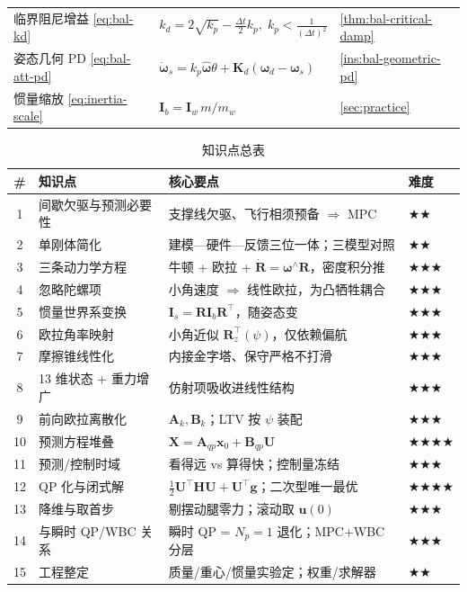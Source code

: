\begin{table}[H]
\begin{tabular}{lll}
临界阻尼增益 \cref{eq:bal-kd} & $k_d=2\sqrt{k_p}-\tfrac{\Delta t}{2}k_p,\;k_p<\tfrac{1}{(\Delta t)^2}$ & \cref{thm:bal-critical-damp} \\
姿态几何 PD \cref{eq:bal-att-pd} & $\dot{\boldsymbol{\omega}}_s=k_p\hat{\boldsymbol{\omega}}\theta+\mathbf{K}_d(\boldsymbol{\omega}_d-\boldsymbol{\omega}_s)$ & \cref{ins:bal-geometric-pd} \\
惯量缩放 \cref{eq:inertia-scale} & $\mathbf{I}_b=\mathbf{I}_w\,m/m_w$ & \cref{sec:practice} \\
\bottomrule
\end{tabular}
\end{table}

\begin{table}[H]\centering\small
\caption{知识点总表}
\begin{tabular}{clll}
\toprule
\# & 知识点 & 核心要点 & 难度 \\
\midrule
1 & 间歇欠驱与预测必要性 & 支撑线欠驱、飞行相须预备 $\Rightarrow$ MPC & \(\bigstar\bigstar\) \\
2 & 单刚体简化 & 建模—硬件—反馈三位一体；三模型对照 & \(\bigstar\bigstar\) \\
3 & 三条动力学方程 & 牛顿 + 欧拉 + $\dot{\mathbf{R}}=\boldsymbol{\omega}^\wedge\mathbf{R}$，密度积分推 & \(\bigstar\bigstar\bigstar\) \\
4 & 忽略陀螺项 & 小角速度 $\Rightarrow$ 线性欧拉，为凸牺牲耦合 & \(\bigstar\bigstar\bigstar\) \\
5 & 惯量世界系变换 & $\mathbf{I}_s=\mathbf{R}\mathbf{I}_b\mathbf{R}^\top$，随姿态变 & \(\bigstar\bigstar\bigstar\) \\
6 & 欧拉角率映射 & 小角近似 $\mathbf{R}_z^\top(\psi)$，仅依赖偏航 & \(\bigstar\bigstar\bigstar\) \\
7 & 摩擦锥线性化 & 内接金字塔、保守严格不打滑 & \(\bigstar\bigstar\bigstar\) \\
8 & 13 维状态 + 重力增广 & 仿射项吸收进线性结构 & \(\bigstar\bigstar\bigstar\) \\
9 & 前向欧拉离散化 & $\mathbf{A}_k,\mathbf{B}_k$；LTV 按 $\psi$ 装配 & \(\bigstar\bigstar\bigstar\) \\
10 & 预测方程堆叠 & $\mathbf{X}=\mathbf{A}_{qp}\boldsymbol{x}_0+\mathbf{B}_{qp}\mathbf{U}$ & \(\bigstar\bigstar\bigstar\bigstar\) \\
11 & 预测/控制时域 & 看得远 vs 算得快；控制量冻结 & \(\bigstar\bigstar\bigstar\) \\
12 & QP 化与闭式解 & $\tfrac12\mathbf{U}^\top\mathbf{H}\mathbf{U}+\mathbf{U}^\top\mathbf{g}$；二次型唯一最优 & \(\bigstar\bigstar\bigstar\bigstar\) \\
13 & 降维与取首步 & 剔摆动腿零力；滚动取 $\boldsymbol{u}(0)$ & \(\bigstar\bigstar\bigstar\) \\
14 & 与瞬时 QP/WBC 关系 & 瞬时 QP = $N_p{=}1$ 退化；MPC+WBC 分层 & \(\bigstar\bigstar\bigstar\) \\
15 & 工程整定 & 质量/重心/惯量实验定；权重/求解器 & \(\bigstar\bigstar\) \\
\bottomrule
\end{tabular}
\end{table}

